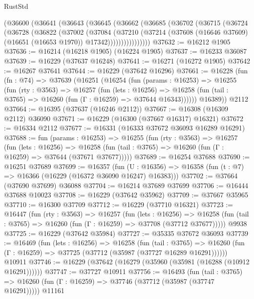 \begin{lexlean}{RustStd}
\begin{coremodule}
    (@36600
      (@36641
        (@36643
          (@36645
            (@36662
              (@36685
                (@36702
                  (@36715
                    (@36724
                      (@36728
                        (@36822
                          (@37002
                            (@37084
                              (@37210
                                (@37214
                                  (@37608
                                    (@16646 @37609)
                                    (@16651 (@16653 @1970))
                                    @17342))))))))))))))))
@37632 := @16212 @1905
@37636 := @16214 (@16218 @1905) (@16224 @1905)
@37637 := @16233 @36087
@37639 := @16229 (@37637 @16248)
@37641 := @16271 (@16272 @1905)
@37642 := @16267 @37641
@37644 := @16229 (@37642 @16296)
@37661 := @16228
    (fun (fn : @74) =>
    @37639
      (@16251
        (@16254
          (fun (params : @16253) =>
          @16255
            (fun (rty : @3563) =>
            @16257
              (fun (lets : @16256) =>
              @16258 (fun (tail : @3765) => @16260 (fun (Γ : @16259) => @37644 @16343))))))
        @16389))
    @2112
@37664 := @16395 (@37637 (@16246 @2112))
@37667 := @16308 (@16309 @2112) @36090
@37671 := @16229 (@16300 (@37667 @16317) @16321)
@37672 := @16334 @2112
@37677 := @16331 (@16333 @37672 @36093 @16289 @16291)
@37688 := fun (params : @16253) =>
  @16255
    (fun (rty : @3563) =>
    @16257
      (fun (lets : @16256) =>
      @16258 (fun (tail : @3765) => @16260 (fun (Γ : @16259) => @37644 (@37671 @37677)))))
@37689 := @16254 @37688
@37690 := @16251 @37689
@37699 := @16357
    (fun (U : @16356) => @16358 (fun (t : @7) => @16366 (@16229 (@16372 @36090 @16247) @16383)))
@37702 := @37664 (@37690 @37699) @36088
@37704 := @16214 @37689 @37699
@37706 := @16444 @37688 @10023
@37708 := @16229 (@37642 @35962)
@37709 := @37667 @35965
@37710 := @16300 @37709
@37712 := @16229 (@37710 @16321)
@37723 := @16447
    (fun (rty : @3563) =>
    @16257
      (fun (lets : @16256) =>
      @16258 (fun (tail : @3765) => @16260 (fun (Γ : @16259) => @37708 (@37712 @37677)))))
    @9938
@37725 := @16229 (@37642 @35984)
@37727 := @35335 @37672 @36093
@37739 := @16469
    (fun (lets : @16256) =>
    @16258
      (fun (tail : @3765) =>
      @16260 (fun (Γ : @16259) => @37725 (@37712 (@35987 (@37727 @16289 @16291))))))
    @10911
@37746 := @16229 (@37642 (@16279 (@35960 (@35981 (@16288 (@10912 @16291))))))
@37747 := @37727 @10911
@37756 := @16493
    (fun (tail : @3765) => @16260 (fun (Γ : @16259) => @37746 (@37712 (@35987 (@37747 @16291)))))
    @11161

\end{coremodule}
\end{lexlean}
